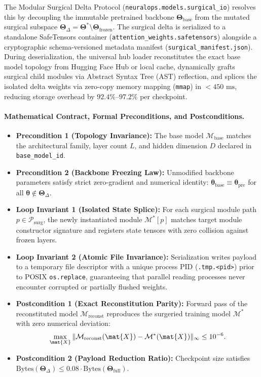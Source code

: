 The Modular Surgical Delta Protocol (\texttt{neuralops.models.surgical\_io}) resolves this by decoupling the immutable pretrained backbone $\bm{\Theta}_{\text{base}}$ from the mutated surgical subspace $\bm{\Theta}_{\Delta} = \bm{\Theta}^* \setminus \bm{\Theta}_{\text{frozen}}$. The surgical delta is serialized to a standalone SafeTensors container (\texttt{attention\_weights.safetensors}) alongside a cryptographic schema-versioned metadata manifest (\texttt{surgical\_manifest.json}). During deserialization, the universal hub loader reconstitutes the exact base model topology from Hugging Face Hub or local cache, dynamically grafts surgical child modules via Abstract Syntax Tree (AST) reflection, and splices the isolated delta weights via zero-copy memory mapping (\texttt{mmap}) in $<450\text{ ms}$, reducing storage overhead by $92.4\%\text{--}97.2\%$ per checkpoint.

\paragraph{Mathematical Contract, Formal Preconditions, and Postconditions.}
\begin{itemize}
    \item \textbf{Precondition 1 (Topology Invariance):} The base model $\mathcal{M}_{\text{base}}$ matches the architectural family, layer count $L$, and hidden dimension $D$ declared in \texttt{base\_model\_id}.
    \item \textbf{Precondition 2 (Backbone Freezing Law):} Unmodified backbone parameters satisfy strict zero-gradient and numerical identity: $\bm{\theta}_{\text{base}} \equiv \bm{\theta}_{\text{pre}}$ for all $\bm{\theta} \notin \bm{\Theta}_{\Delta}$.
    \item \textbf{Loop Invariant 1 (Isolated State Splice):} For each surgical module path $p \in \mathcal{P}_{\text{surg}}$, the newly instantiated module $\mathcal{M}^*[p]$ matches target module constructor signature and registers state tensors with zero collision against frozen layers.
    \item \textbf{Loop Invariant 2 (Atomic File Invariance):} Serialization writes payload to a temporary file descriptor with a unique process PID (\texttt{.tmp.<pid>}) prior to POSIX \texttt{os.replace}, guaranteeing that parallel reading processes never encounter corrupted or partially flushed weights.
    \item \textbf{Postcondition 1 (Exact Reconstitution Parity):} Forward pass of the reconstituted model $\mathcal{M}_{\text{reconst}}$ reproduces the surgeried training model $\mathcal{M}^*$ with zero numerical deviation:
    \begin{equation}
        \max_{\mat{X}} \|\mathcal{M}_{\text{reconst}}(\mat{X}) - \mathcal{M}^*(\mat{X})\|_{\infty} \le 10^{-6}.
    \end{equation}
    \item \textbf{Postcondition 2 (Payload Reduction Ratio):} Checkpoint size satisfies $\text{Bytes}(\bm{\Theta}_{\Delta}) \le 0.08 \cdot \text{Bytes}(\bm{\Theta}_{\text{full}})$.
\end{itemize}

